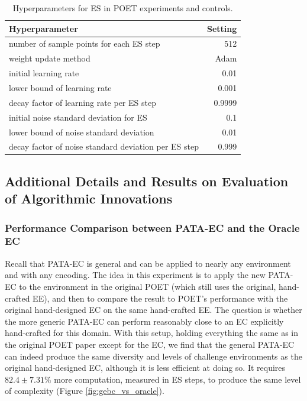 \documentclass{article}
\begin{document}
\begin{table}[htp]
\centering
\begin{tabular}{lr}
\toprule
Hyperparameter & Setting \\
\midrule
number of sample points for each ES step & 512 \\
weight update method & Adam \cite{kingma2014adam} \\
initial learning rate & 0.01 \\
lower bound of learning rate  & 0.001 \\
decay factor of learning rate  per ES step &  0.9999 \\
initial noise standard deviation for ES & 0.1 \\
lower bound of noise standard deviation  & 0.01 \\
decay factor of noise standard deviation  per ES step &  0.999 \\

\bottomrule
\end{tabular}
\caption{Hyperparameters for ES in POET experiments and controls.}
\label{tab:poet_hyperparams}
\end{table}


\subsection{Additional Details and Results on Evaluation of Algorithmic Innovations}
\label{appendix:exp_1_2}


\subsubsection{Performance Comparison between PATA-EC and the Oracle EC}
\label{appendix:figure_4}

Recall that PATA-EC is general and can be applied to nearly any environment and with any encoding.
The idea in this experiment is to apply the new PATA-EC to the environment in the original POET (which still uses the original, hand-crafted EE), and then to compare the result to POET's performance with the original hand-designed EC on the same hand-crafted EE. The question is whether the more generic PATA-EC can perform reasonably close to an EC explicitly hand-crafted for this domain. With this setup, holding everything the same as in the original POET paper except for the EC, we find that the general PATA-EC can indeed produce the same diversity and levels of challenge environments as the original hand-designed EC, although it is less efficient at doing so. It requires $82.4 \pm 7.31 \%$ more computation, measured in ES steps, to produce the same level of complexity (Figure \ref{fig:gebc_vs_oracle}).   
\end{document}
